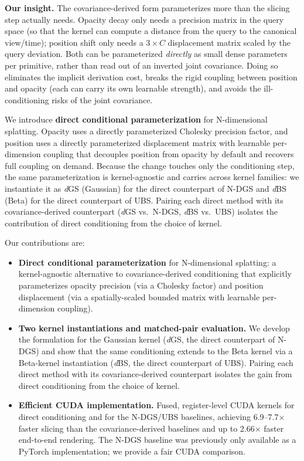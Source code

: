 \documentclass{article}
\newcommand{\dgs}{\textit{d}GS\xspace}
\newcommand{\dbs}{\textit{d}BS\xspace}
\theoremstyle{plain}
\theoremstyle{definition}
\theoremstyle{remark}
\begin{document}
\textbf{Our insight.} The covariance-derived form parameterizes more than the slicing step actually needs. Opacity decay only needs a precision matrix in the query space (so that the kernel can compute a distance from the query to the canonical view/time); position shift only needs a $3{\times}C$ displacement matrix scaled by the query deviation. Both can be parameterized \textit{directly} as small dense parameters per primitive, rather than read out of an inverted joint covariance. Doing so eliminates the implicit derivation cost, breaks the rigid coupling between position and opacity (each can carry its own learnable strength), and avoids the ill-conditioning risks of the joint covariance.

We introduce \textbf{direct conditional parameterization} for N-dimensional splatting. Opacity uses a directly parameterized Cholesky precision factor, and position uses a directly parameterized displacement matrix with learnable per-dimension coupling that decouples position from opacity by default and recovers full coupling on demand. Because the change touches only the conditioning step, the same parameterization is kernel-agnostic and carries across kernel families: we instantiate it as \dgs{} (Gaussian) for the direct counterpart of N-DGS and \dbs{} (Beta) for the direct counterpart of UBS. Pairing each direct method with its covariance-derived counterpart (\dgs{} vs.\ N-DGS, \dbs{} vs.\ UBS) isolates the contribution of direct conditioning from the choice of kernel.

Our contributions are:

\begin{itemize}[leftmargin=*]
\item \textbf{Direct conditional parameterization} for N-dimensional splatting: a kernel-agnostic alternative to covariance-derived conditioning that explicitly parameterizes opacity precision (via a Cholesky factor) and position displacement (via a spatially-scaled bounded matrix with learnable per-dimension coupling).

\item \textbf{Two kernel instantiations and matched-pair evaluation.} We develop the formulation for the Gaussian kernel (\dgs{}, the direct counterpart of N-DGS) and show that the same conditioning extends to the Beta kernel via a Beta-kernel instantiation (\dbs{}, the direct counterpart of UBS). Pairing each direct method with its covariance-derived counterpart isolates the gain from direct conditioning from the choice of kernel.

\item \textbf{Efficient CUDA implementation.} Fused, register-level CUDA kernels for direct conditioning and for the N-DGS/UBS baselines, achieving 6.9--7.7$\times$ faster slicing than the covariance-derived baselines and up to 2.66$\times$ faster end-to-end rendering. The N-DGS baseline was previously only available as a PyTorch implementation; we provide a fair CUDA comparison.
\end{itemize}
\end{document}
